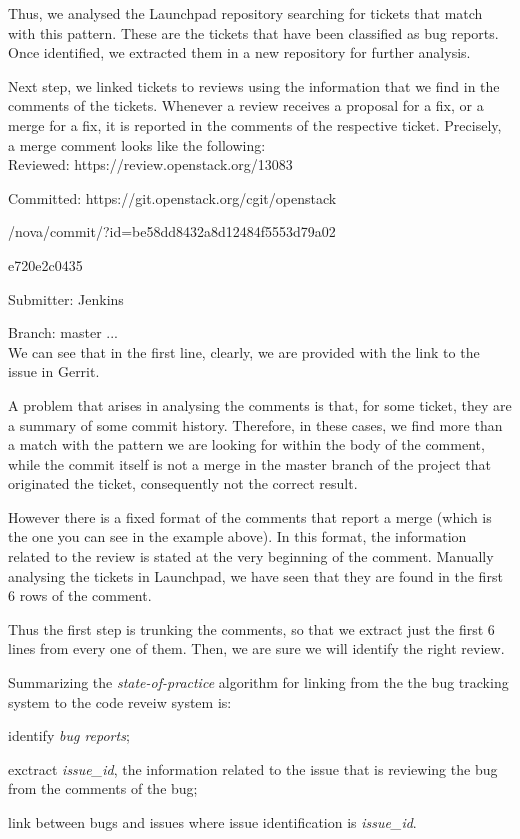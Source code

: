 \documentclass{sig-alternate-05-2015}
\begin{document}
Thus, we analysed the Launchpad repository searching for tickets that match with this pattern. 
These are the tickets that have been classified as bug reports. Once identified, we extracted them in a 
new repository for further analysis. 

Next step, we linked tickets to reviews using the information that we find in the comments of the tickets. 
Whenever a review receives a proposal for a fix, or a merge for a fix, it is reported in the 
comments of the respective ticket. 
Precisely, a merge comment looks like the following: 
\\

Reviewed: https://review.openstack.org/13083

Committed: https://git.openstack.org/cgit/openstack

/nova/commit/?id=be58dd8432a8d12484f5553d79a02

e720e2c0435

Submitter: Jenkins

Branch: master ...
\\

We can see that in the first line, clearly, we are provided with the link to the issue in Gerrit. 

A problem that arises in analysing the comments is that, for some ticket, they are a summary of some commit history. 
Therefore, in these cases, we find more than a match with the pattern we are looking for within the body of 
the comment, while the commit itself is not a merge in the master branch of the project that originated the ticket, 
consequently not the correct result. 

However there is a fixed format of the comments that report a merge (which is the one you can see in the example above).
In this format, the information related to the review is stated at the very beginning of the 
comment. Manually analysing the tickets in Launchpad, we have seen that they are found in the first 6 rows of the comment.

Thus the first step is trunking the comments, so that we extract just the first 6 lines from every one of them. 
Then, we are sure we will identify the right review. 

Summarizing the \emph{state-of-practice} algorithm for linking from the the bug tracking system to 
the code reveiw system is:

\begin{list}{}{}

\item[$\space$] identify \emph{bug reports};

exctract \emph{issue\_id}, the information related to the issue that is reviewing the bug from the comments of the bug;

link between bugs and issues where issue identification is \emph{issue\_id}.

\end{list}
\end{document}
